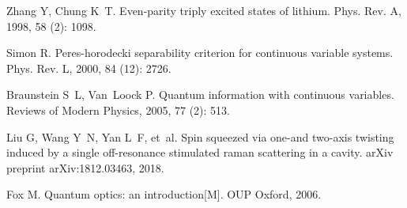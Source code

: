 \begin{thebibliography}{113}
	Zhang Y, Chung K~T.
	\newblock Even-parity triply excited states of lithium\allowbreak[J].
	\newblock Phys. Rev. A, 1998, 58 (2): 1098.
	
	Simon R.
	\newblock Peres-horodecki separability criterion for continuous variable
	systems\allowbreak[J].
	\newblock Phys. Rev. L, 2000, 84 (12): 2726.
	
	Braunstein S~L, Van~Loock P.
	\newblock Quantum information with continuous variables\allowbreak[J].
	\newblock Reviews of Modern Physics, 2005, 77 (2): 513.
	
	Liu G, Wang Y~N, Yan L~F, et~al.
	\newblock Spin squeezed via one-and two-axis twisting induced by a single
	off-resonance stimulated raman scattering in a cavity\allowbreak[J].
	\newblock arXiv preprint arXiv:1812.03463, 2018.
	
	Fox M.
	\newblock Quantum optics: an introduction[M]. OUP Oxford, 2006.
	
\end{thebibliography}

